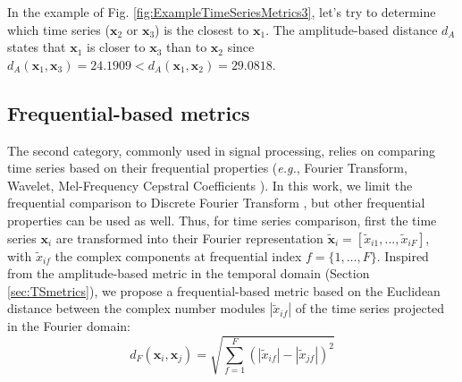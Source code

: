 In the example of Fig. \ref{fig:ExampleTimeSeriesMetrics3}, let's try to determine which time series ($\textbf{x}_2$ or $\textbf{x}_3$) is the closest to $\textbf{x}_1$. The amplitude-based distance $d_A$ states that $\textbf{x}_1$ is closer to $\textbf{x}_3$ than to $\textbf{x}_2$ since $d_A(\textbf{x}_1,\textbf{x}_3) = 24.1909 < d_A(\textbf{x}_1,\textbf{x}_2) = 29.0818$.



\subsection{Frequential-based metrics}
The second category, commonly used in signal processing, relies on comparing time series based on their frequential properties (\textit{e.g.}, Fourier Transform, Wavelet, Mel-Frequency Cepstral Coefficients \cite{Sahidullah2012,Torrence1998,Brigham1967}). In this work, we limit the frequential comparison to Discrete Fourier Transform \cite{Lhermitte2011a}, but other frequential properties can be used as well. Thus, for time series comparison, first the time series $\textbf{x}_i$ are transformed into their Fourier representation $\tilde{\textbf{x}}_i=[\tilde{x}_{i1}, ...,  \tilde{x}_{iF}]$, with $\tilde{x}_{if}$ the complex components at frequential index $f=\{1,\ldots,F\}$. Inspired from the amplitude-based metric in the temporal domain (Section \ref{sec:TSmetrics}), we propose a frequential-based metric based on the Euclidean distance between the complex number modules $|\tilde{x}_{if}|$ of the time series projected in the Fourier domain:
\begin{equation}
d_{F}(\textbf{x}_i,\textbf{x}_j) = \sqrt{\sum_{f=1}^{F} 
	(|\tilde{x}_{if}|-|\tilde{x}_{jf}|)^2}
\label{eq:F}
\end{equation}

